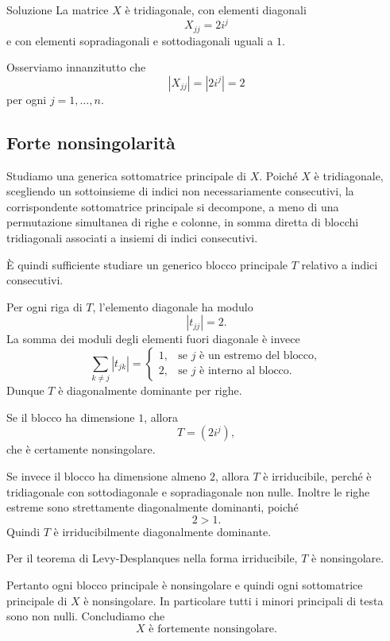 \documentclass[a4paper]{article}
\begin{document}
\begin{snippetsolution}{Soluzione}
    La matrice \(X\) è tridiagonale, con elementi diagonali
    \[
        X_{jj}=2i^j
    \]
    e con elementi sopradiagonali e sottodiagonali uguali a \(1\).

    Osserviamo innanzitutto che
    \[
        |X_{jj}|=|2i^j|=2
    \]
    per ogni \(j=1,\dots,n\).

    \subsection*{Forte nonsingolarità}

    Studiamo una generica sottomatrice principale di \(X\). Poiché \(X\) è tridiagonale, scegliendo un sottoinsieme di indici non necessariamente consecutivi, la corrispondente sottomatrice principale si decompone, a meno di una permutazione simultanea di righe e colonne, in somma diretta di blocchi tridiagonali associati a insiemi di indici consecutivi.

    È quindi sufficiente studiare un generico blocco principale \(T\) relativo a indici consecutivi.

    Per ogni riga di \(T\), l'elemento diagonale ha modulo
    \[
        |t_{jj}|=2.
    \]
    La somma dei moduli degli elementi fuori diagonale è invece
    \[
        \sum_{k\neq j}|t_{jk}|
        =
        \begin{cases}
            1, & \text{se } j \text{ è un estremo del blocco},\\
            2, & \text{se } j \text{ è interno al blocco}.
        \end{cases}
    \]
    Dunque \(T\) è diagonalmente dominante per righe.

    Se il blocco ha dimensione \(1\), allora
    \[
        T=(2i^j),
    \]
    che è certamente nonsingolare.

    Se invece il blocco ha dimensione almeno \(2\), allora \(T\) è irriducibile, perché è tridiagonale con sottodiagonale e sopradiagonale non nulle. Inoltre le righe estreme sono strettamente diagonalmente dominanti, poiché
    \[
        2>1.
    \]
    Quindi \(T\) è irriducibilmente diagonalmente dominante.

    Per il teorema di Levy-Desplanques nella forma irriducibile, \(T\) è nonsingolare.

    Pertanto ogni blocco principale è nonsingolare e quindi ogni sottomatrice principale di \(X\) è nonsingolare. In particolare tutti i minori principali di testa sono non nulli. Concludiamo che
    \[
        X \text{ è fortemente nonsingolare.}
    \]


\end{snippetsolution}
\end{document}
